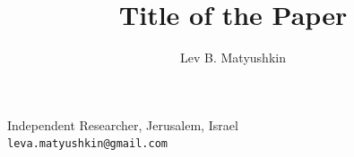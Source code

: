 \documentclass[12pt]{article}
\begin{document}
\title{Title of the Paper}

\author{Lev B. Matyushkin}

\date{}
\maketitle

\begin{center}
Independent Researcher, Jerusalem, Israel \\
\texttt{leva.matyushkin@gmail.com}
\end{center}





\end{document}
